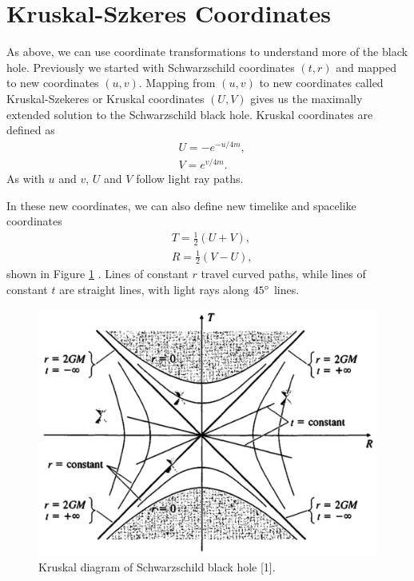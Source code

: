 \documentclass[10pt]{article}
\begin{document}
\section{Kruskal-Szkeres Coordinates}
As above, we can use coordinate transformations to understand more of the black hole. Previously we started with Schwarzschild coordinates $(t,r)$ and mapped to new coordinates $(u,v)$. Mapping from $(u,v)$ to new coordinates called Kruskal-Szekeres or Kruskal coordinates $(U,V)$ gives us the maximally extended solution to the Schwarzschild black hole. Kruskal coordinates are defined as
\begin{align}
& U = -e^{-u/4m},
\\
& V = e^{v/4m}.
\end{align}
As with $u$ and $v$, $U$ and $V$ follow light ray paths.

In these new coordinates, we can also define new timelike and spacelike coordinates
\begin{align}
& T = \frac{1}{2}(U+V),
\\
& R = \frac{1}{2}(V-U),
\end{align}
shown in Figure \ref{fig:kruskal} . Lines of constant $r$ travel curved paths, while lines of constant $t$ are straight lines, with light rays along $45\degree$ lines.

\begin{figure}[h]\label{fig:kruskal}
\centering
\includegraphics[scale=0.2]{carroll_fig_5_12.png} 
\caption{Kruskal diagram of Schwarzschild black hole [1].}
\end{figure}
\end{document}
